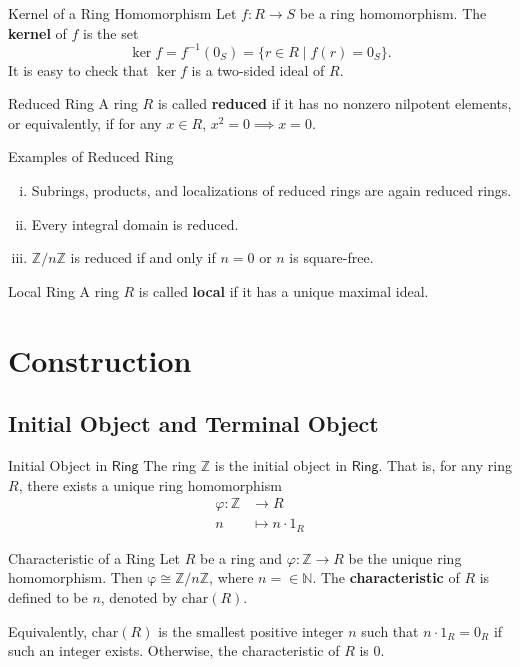 \begin{definition}{Kernel of a Ring Homomorphism}{}
    Let $f:R\to S$ be a ring homomorphism. The \textbf{kernel} of $f$ is the set
    \[
        \ker f=f^{-1}(0_S)=\{r\in R\mid f(r)=0_S\}.
    \]
    It is easy to check that $\ker f$ is a two-sided ideal of $R$.
\end{definition}


\begin{definition}{Reduced Ring}{}
    A ring $R$ is called \textbf{reduced} if it has no nonzero nilpotent elements, or equivalently, if for any $x\in R$, $x^2=0\implies x=0$.
\end{definition}


\begin{proposition}{Examples of Reduced Ring}{}
    \begin{enumerate}[(i)]
        \item Subrings, products, and localizations of reduced rings are again reduced rings.
        \item Every integral domain is reduced.
        \item $\mathbb{Z}/n\mathbb{Z}$ is reduced if and only if $n=0$ or $n$ is square-free.
    \end{enumerate}
\end{proposition}


\begin{definition}{Local Ring}{}
    A ring $R$ is called \textbf{local} if it has a unique maximal ideal.
\end{definition}

\section{Construction}
\subsection{Initial Object and Terminal Object}
\begin{proposition}{Initial Object in $\mathsf{Ring}$}{}
    The ring $\mathbb{Z}$ is the initial object in $\mathsf{Ring}$. That is, for any ring $R$, there exists a unique ring homomorphism
    \begin{align*}
        \varphi:\mathbb{Z}&\longrightarrow R\\
        n&\longmapsto n\cdot 1_R
    \end{align*}
\end{proposition}

\begin{definition}{Characteristic of a Ring}{}
    Let $R$ be a ring and $\varphi:\mathbb{Z}\to R$ be the unique ring homomorphism. Then $\mathrm{\varphi}\cong \mathbb{Z}/n\mathbb{Z}$, where $n=\in\mathbb{N}$.
    The \textbf{characteristic} of $R$ is defined to be $n$, denoted by $\mathrm{char}(R)$.

    Equivalently, $\mathrm{char}(R)$ is the smallest positive integer $n$ such that $n\cdot 1_R=0_R$ if such an integer exists. Otherwise, the characteristic of $R$ is $0$.
\end{definition}

